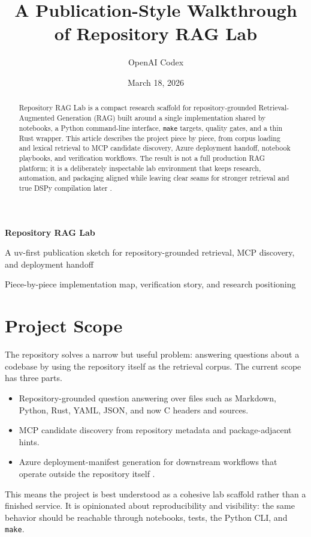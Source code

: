 \documentclass[11pt]{article}
\title{\vspace{-1.6em}A Publication-Style Walkthrough of Repository RAG Lab}
\author{OpenAI Codex}
\date{March 18, 2026}
\newcommand{\projectbanner}{
  \noindent
  \colorbox{PaperNavy}{%
    \parbox{\dimexpr\linewidth-2\fboxsep\relax}{%
      \vspace{14pt}
      {\color{white}\fontsize{20}{22}\selectfont\bfseries Repository RAG Lab}\par
      \vspace{4pt}
      {\color{PaperMist}\large A uv-first publication sketch for repository-grounded retrieval, MCP discovery, and deployment handoff}\par
      \vspace{8pt}
      {\color{PaperGold}\normalsize Piece-by-piece implementation map, verification story, and research positioning}\par
      \vspace{14pt}
    }%
  }
}
\begin{document}
\projectbanner

\vspace{1.25em}
\maketitle
\thispagestyle{empty}

\begin{abstract}
Repository RAG Lab is a compact research scaffold for repository-grounded Retrieval-Augmented
Generation (RAG) built around a single implementation shared by notebooks, a Python command-line
interface, \texttt{make} targets, quality gates, and a thin Rust wrapper. This article describes
the project piece by piece, from corpus loading and lexical retrieval to MCP candidate discovery,
Azure deployment handoff, notebook playbooks, and verification workflows. The result is not a
full production RAG platform; it is a deliberately inspectable lab environment that keeps
research, automation, and packaging aligned while leaving clear seams for stronger retrieval and
true DSPy compilation later \cite{lewis2020rag,khattab2024dspy,mcp2024}.
\end{abstract}

\section{Project Scope}

The repository solves a narrow but useful problem: answering questions about a codebase by using
the repository itself as the retrieval corpus. The current scope has three parts.

\begin{itemize}
  \item Repository-grounded question answering over files such as Markdown, Python, Rust, YAML,
  JSON, and now C headers and sources.
  \item MCP candidate discovery from repository metadata and package-adjacent hints.
  \item Azure deployment-manifest generation for downstream workflows that operate outside the
  repository itself \cite{azureinference2025}.
\end{itemize}

This means the project is best understood as a cohesive lab scaffold rather than a finished
service. It is opinionated about reproducibility and visibility: the same behavior should be
reachable through notebooks, tests, the Python CLI, and \texttt{make}.
\end{document}
